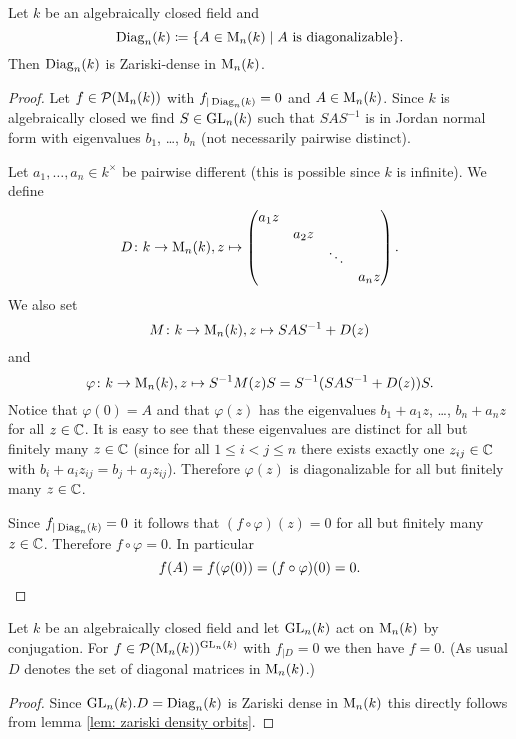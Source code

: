 \begin{prop}
  Let $k$ be an algebraically closed field and
  \[
    \operatorname{Diag}_n(k) \coloneqq \{A \in \operatorname{M}_n(k) \mid \text{$A$ is diagonalizable}\}.
  \]
  Then $\operatorname{Diag}_n(k)$ is Zariski-dense in $\operatorname{M}_n(k)$.
\end{prop}
\begin{proof}
  Let $f \in \mathcal{P}(\operatorname{M}_n(k))$ with $f_{|\operatorname{Diag}_n(k)} = 0$ and $A \in \operatorname{M}_n(k)$. Since $k$ is algebraically closed we find $S \in \operatorname{GL}_n(k)$ such that $SAS^{-1}$ is in Jordan normal form with eigenvalues $b_1$, \dots, $b_n$ (not necessarily pairwise distinct).
  
  Let $a_1, \dotsc, a_n \in k^\times$ be pairwise different (this is possible since $k$ is infinite). We define
  \[
    D \colon k \to \operatorname{M}_n(k), z \mapsto
    \begin{pmatrix}
      a_1 z &       &        &       \\
                  & a_2 z &        &       \\
                  &       & \ddots &       \\
                  &       &        & a_n z
    \end{pmatrix}.
  \]
  We also set
  \[
    M \colon k \to \operatorname{M}_n(k), z \mapsto SAS^{-1} + D(z)
  \]
  and
  \[
    \varphi \colon k \to \operatorname{M}_n(k), z \mapsto S^{-1} M(z) S = S^{-1}(SAS^{-1}+D(z))S.
  \]
  Notice that $\varphi(0) = A$ and that $\varphi(z)$ has the eigenvalues $b_1 + a_1 z$, \dots, $b_n + a_n z$ for all $z \in \mathbb{C}$. It is easy to see that these eigenvalues are distinct for all but finitely many $z \in \mathbb{C}$ (since for all $1 \leq i < j \leq n$ there exists exactly one $z_{ij} \in \mathbb{C}$ with $b_i + a_i z_{ij} = b_j + a_j z_{ij}$). Therefore $\varphi(z)$ is diagonalizable for all but finitely many $z \in \mathbb{C}$.
  
  Since $f_{|\operatorname{Diag}_n(k)} = 0$ it follows that $(f \circ \varphi)(z) = 0$ for all but finitely many $z \in \mathbb{C}$. Therefore $f \circ \varphi = 0$. In particular
  \[
    f(A) = f(\varphi(0)) = (f \circ \varphi)(0) = 0.
    \qedhere
  \]
\end{proof}


\begin{cor}\label{cor: diagonal matrices dense alg closed}
  Let $k$ be an algebraically closed field and let $\operatorname{GL}_n(k)$ act on $\operatorname{M}_n(k)$ by conjugation. For $f \in \mathcal{P}(\operatorname{M}_n(k))^{\operatorname{GL}_n(k)}$ with $f_{|D} = 0$ we then have $f = 0$. (As usual $D$ denotes the set of diagonal matrices in $\operatorname{M}_n(k)$.)
\end{cor}
\begin{proof}
  Since $\operatorname{GL}_n(k).D = \operatorname{Diag}_n(k)$ is Zariski dense in $\operatorname{M}_n(k)$ this directly follows from lemma \ref{lem: zariski density orbits}.
\end{proof}


